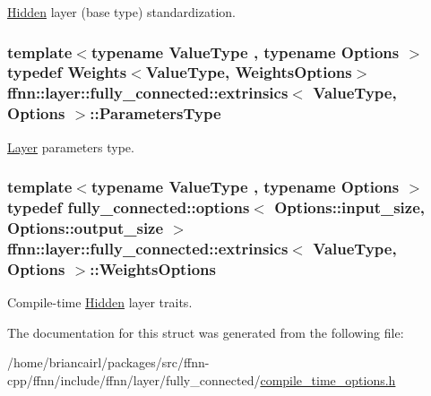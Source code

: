 \hyperlink{classffnn_1_1layer_1_1_hidden}{Hidden} layer (base type) standardization. 

\hypertarget{structffnn_1_1layer_1_1fully__connected_1_1extrinsics_a829f6f75fcd23a45225c85b7b0ac51f3}{
\subsubsection[{Parameters\-Type}]{\setlength{\rightskip}{0pt plus 5cm}template$<$typename Value\-Type , typename Options $>$ typedef {\bf Weights}$<$Value\-Type, {\bf Weights\-Options}$>$ {\bf ffnn\-::layer\-::fully\-\_\-connected\-::extrinsics}$<$ Value\-Type, Options $>$\-::{\bf Parameters\-Type}}}\label{structffnn_1_1layer_1_1fully__connected_1_1extrinsics_a829f6f75fcd23a45225c85b7b0ac51f3}


\hyperlink{classffnn_1_1layer_1_1_layer}{Layer} parameters type. 

\hypertarget{structffnn_1_1layer_1_1fully__connected_1_1extrinsics_ab1412ad01dbaed107141f39e23c73ab5}{
\subsubsection[{Weights\-Options}]{\setlength{\rightskip}{0pt plus 5cm}template$<$typename Value\-Type , typename Options $>$ typedef {\bf fully\-\_\-connected\-::options}$<$ Options\-::input\-\_\-size, Options\-::output\-\_\-size $>$ {\bf ffnn\-::layer\-::fully\-\_\-connected\-::extrinsics}$<$ Value\-Type, Options $>$\-::{\bf Weights\-Options}}}\label{structffnn_1_1layer_1_1fully__connected_1_1extrinsics_ab1412ad01dbaed107141f39e23c73ab5}


Compile-\/time \hyperlink{classffnn_1_1layer_1_1_hidden}{Hidden} layer traits. 



The documentation for this struct was generated from the following file\-:\begin{DoxyCompactItemize}
\item 
/home/briancairl/packages/src/ffnn-\/cpp/ffnn/include/ffnn/layer/fully\-\_\-connected/\hyperlink{fully__connected_2compile__time__options_8h}{compile\-\_\-time\-\_\-options.\-h}\end{DoxyCompactItemize}
